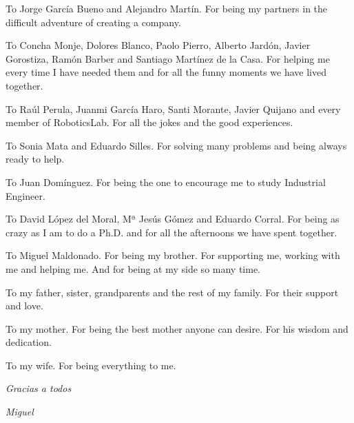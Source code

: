 To Jorge Garc{\'i}a Bueno and Alejandro Mart{\'i}n. For being my partners in the difficult adventure of creating a company.

To  Concha Monje, Dolores Blanco, Paolo Pierro, Alberto Jard{\'o}n, Javier Gorostiza, Ram{\'on} Barber and Santiago Mart{\'i}nez de la Casa. For  helping me every time I have needed them and for all the funny moments we have lived together. 

To Raúl Perula, Juanmi García Haro, Santi Morante, Javier Quijano and  every member of RoboticsLab. For all the jokes and the good experiences.

To Sonia Mata and Eduardo Silles. For solving many problems and being always ready to help.

To Juan Dom\'inguez. For being the one to encourage me to study Industrial Engineer.

To David L{\'o}pez del Moral, Mª Jes{\'u}s G{\'o}mez and Eduardo Corral. For being as crazy as I am to do a Ph.D. and for all the afternoons we have spent together.

To Miguel Maldonado. For being my brother. For supporting me, working with me and helping me. And for being at my side so many time.

To my father, sister, grandparents and the rest of my family. For their support and love.

To my mother. For being the best mother anyone can desire. For his wisdom and dedication.

To my wife. For being everything to me.

\vspace{20mm}
\begin{flushright}
\textit{Gracias a todos}
\end{flushright}
\begin{flushright}
\textit{Miguel}
\end{flushright}





